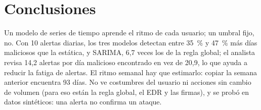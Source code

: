 \documentclass[runningheads,a4paper]{llncs}
\begin{document}
\section{Conclusiones}

Un modelo de series de tiempo aprende el ritmo de cada usuario; un umbral fijo, no. Con 10 alertas diarias, los tres modelos detectan entre 35~\% y 47~\% más días maliciosos que la estática, y SARIMA, 6,7 veces los de la regla global; el analista revisa 14,2 alertas por día malicioso encontrado en vez de 20,9, lo que ayuda a reducir la fatiga de alertas. El ritmo semanal hay que estimarlo: copiar la semana anterior encuentra 93 días. No ve costumbres del usuario ni acciones sin cambio de volumen (para eso están la regla global, el EDR y las firmas), y se probó en datos sintéticos: una alerta no confirma un ataque.



\end{document}
